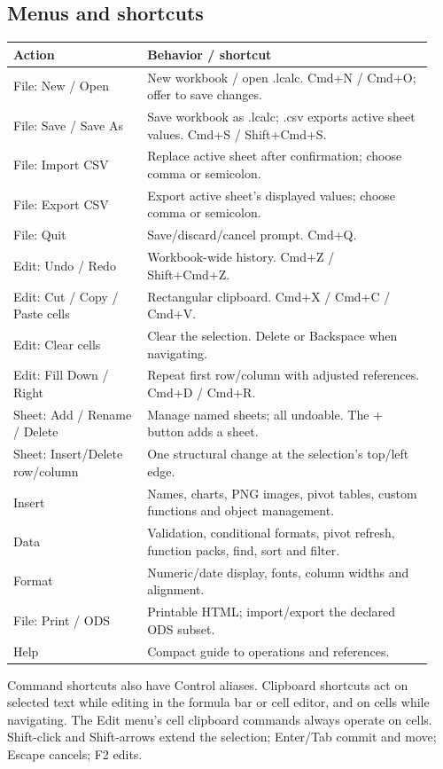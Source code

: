 \documentclass[11pt,letterpaper]{article}
\begin{document}
\subsection{Menus and shortcuts}
\begingroup\small
\begin{longtable}{@{}P{0.30\linewidth}P{0.64\linewidth}@{}}
\toprule\textbf{Action} & \textbf{Behavior / shortcut}\\\midrule\endhead
File: New / Open & New workbook / open .lcalc. Cmd+N / Cmd+O; offer to save changes.\\
File: Save / Save As & Save workbook as .lcalc; .csv exports active sheet values. Cmd+S / Shift+Cmd+S.\\
File: Import CSV & Replace active sheet after confirmation; choose comma or semicolon.\\
File: Export CSV & Export active sheet's displayed values; choose comma or semicolon.\\
File: Quit & Save/discard/cancel prompt. Cmd+Q.\\
Edit: Undo / Redo & Workbook-wide history. Cmd+Z / Shift+Cmd+Z.\\
Edit: Cut / Copy / Paste cells & Rectangular clipboard. Cmd+X / Cmd+C / Cmd+V.\\
Edit: Clear cells & Clear the selection. Delete or Backspace when navigating.\\
Edit: Fill Down / Right & Repeat first row/column with adjusted references. Cmd+D / Cmd+R.\\
Sheet: Add / Rename / Delete & Manage named sheets; all undoable. The + button adds a sheet.\\
Sheet: Insert/Delete row/column & One structural change at the selection's top/left edge.\\
Insert & Names, charts, PNG images, pivot tables, custom functions and object management.\\
Data & Validation, conditional formats, pivot refresh, function packs, find, sort and filter.\\
Format & Numeric/date display, fonts, column widths and alignment.\\
File: Print / ODS & Printable HTML; import/export the declared ODS subset.\\
Help & Compact guide to operations and references.\\
\bottomrule
\end{longtable}\endgroup
Command shortcuts also have Control aliases. Clipboard shortcuts act on selected
text while editing in the formula bar or cell editor, and on cells while navigating.
The Edit menu's cell clipboard commands always operate on cells. Shift-click and
Shift-arrows extend the selection; Enter/Tab commit and move; Escape cancels; F2 edits.
\end{document}
